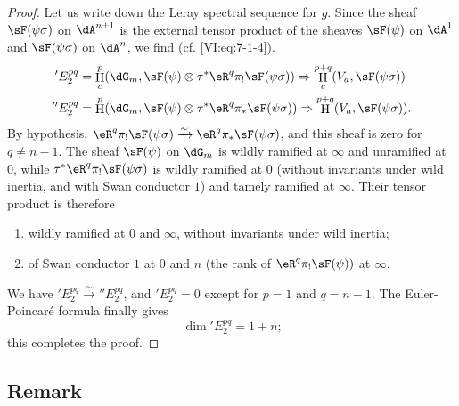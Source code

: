 \documentclass[oneside]{book}
\DeclareMathOperator{\h}{H}
\newcommand{\iso}{\xrightarrow\sim}
\theoremstyle{sga-source}
\theoremstyle{sga-source-dash}
\theoremstyle{sga-source-dotdash}
\theoremstyle{sga-source-number-note-dash}
\theoremstyle{sga-source-note-number-dotdash}
\theoremstyle{sga-source-example-dotdash}
\theoremstyle{sga-source-inline-number}
\theoremstyle{sga-source-bare-number}
\theoremstyle{sga-source}
\begin{document}
\begin{proof}[Proof]
Let us write down the Leray spectral sequence for $g$. Since the sheaf $\sF(\psi\sigma)$ on 
$\dA^{n+1}$ is the external tensor product of the sheaves $\sF(\psi)$ on 
$\dA^1$ and $\sF(\psi\sigma)$ on $\dA^n$, we find (cf. \eqref{VI:eq:7-1-4}). 
\begin{align*}
  'E_2^{p q} &= \h_c^p(\dG_m,\sF(\psi)\otimes \tau^\ast \eR^q \pi_! \sF(\psi\sigma)) \Rightarrow \h_c^{p+q}(V_a,\sF(\psi\sigma)) \\
  ''E_2^{p q} &= \h^p(\dG_m,\sF(\psi)\otimes \tau^\ast \eR^q \pi_\ast \sF(\psi\sigma)) \Rightarrow \h^{p+q}(V_a,\sF(\psi\sigma)) \text{.} 
\end{align*}
By hypothesis, 
$\eR^q \pi_! \sF(\psi\sigma) \iso \eR^q \pi_\ast \sF(\psi\sigma)$, and this 
sheaf is zero for $q\ne n-1$. The sheaf $\sF(\psi)$ on $\dG_m$ is 
wildly ramified at $\infty$ and unramified at $0$, while 
$\tau^\ast \eR^q \pi_! \sF(\psi\sigma)$ is wildly ramified at $0$ (without 
invariants under wild inertia, and with Swan conductor $1$) and tamely 
ramified at $\infty$. Their tensor product is therefore 
\begin{enumerate}[\indent a)]
  \item wildly ramified at $0$ and $\infty$, without invariants under wild 
    inertia; 
  \item of Swan conductor $1$ at $0$ and $n$ (the rank of 
    $\eR^q \pi_! \sF(\psi))$ at $\infty$. 
\end{enumerate}
We have $'E_2^{p q} \iso ''E_2^{p q}$, and $'E_2^{p q}=0$ except for $p=1$ and 
$q=n-1$. The Euler-Poincaré formula finally gives 
\[
  \dim{'E_2^{p q}} = 1+n \text{;} 
\]
this completes the proof. 
\end{proof}





\subsection{Remark}\label{VI:7-15}
\end{document}
